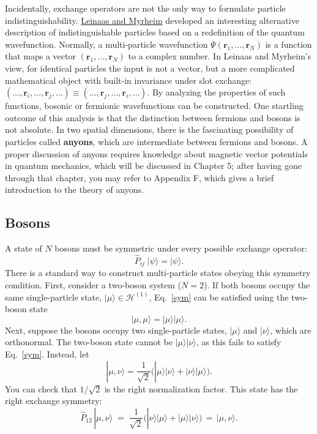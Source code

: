 \documentclass[prx,12pt]{revtex4-2}
\begin{document}
Incidentally, exchange operators are not the only way to formulate
particle indistinguishability.  \hyperref[cite:leinaas]{Leinaas and
  Myrheim} developed an interesting alternative description of
indistinguishable particles based on a redefinition of the quantum
wavefunction.  Normally, a multi-particle wavefunction
$\Psi(\mathbf{r}_1, \dots, \mathbf{r}_N)$ is a function that maps a
vector $(\mathbf{r}_1, \dots, \mathbf{r}_N)$ to a complex number.  In
Leinaas and Myrheim's view, for identical particles the input is not a
vector, but a more complicated mathematical object with built-in
invariance under slot exchange: $(\dots, \mathbf{r}_i, \dots,
\mathbf{r}_j,\dots ) \equiv (\dots, \mathbf{r}_j, \dots,
\mathbf{r}_i,\dots )$.  By analyzing the properties of such functions,
bosonic or fermionic wavefunctions can be constructed.  One startling
outcome of this analysis is that the distinction between fermions and
bosons is not absolute.  In two spatial dimensions, there is the
fascinating possibility of particles called \textbf{anyons}, which are
intermediate between fermions and bosons.  A proper discussion of
anyons requires knowledge about magnetic vector potentials in quantum
mechanics, which will be discussed in Chapter 5; after having gone
through that chapter, you may refer to Appendix F, which gives a brief
introduction to the theory of anyons.

\subsection{Bosons}
\label{sec:bosons}

A state of $N$ bosons must be symmetric under every possible exchange
operator:
\begin{equation}
  \hat{P}_{ij}\; |\psi\rangle = |\psi\rangle.
  \label{sym}
\end{equation}
There is a standard way to construct multi-particle states obeying
this symmetry condition.  First, consider a two-boson system ($N =
2$).  If both bosons occupy the same single-particle state,
$|\mu\rangle \in \mathscr{H}^{(1)}$, Eq.~\eqref{sym} can be satisfied
using the two-boson state
\begin{equation}
  |\mu,\mu\rangle = |\mu\rangle  |\mu\rangle.
  \label{mumu}
\end{equation}
Next, suppose the bosons occupy two single-particle states,
$|\mu\rangle$ and $|\nu\rangle$, which are orthonormal.  The two-boson
state cannot be $|\mu\rangle |\nu\rangle$, as this fails to satisfy
Eq.~\eqref{sym}.  Instead, let
\begin{equation}
  |\mu,\nu\rangle = \frac{1}{\sqrt{2}} \Big( |\mu\rangle |\nu\rangle +
  |\nu\rangle |\mu\rangle\Big).
  \label{bosonmunu}
\end{equation}
You can check that $1/\sqrt{2}$ is the right normalization factor.
This state has the right exchange symmetry:
\begin{equation}
  \hat{P}_{12}\,|\mu,\nu\rangle \;=\; \frac{1}{\sqrt{2}}
  \Big( |\nu\rangle  |\mu\rangle + |\mu\rangle  |\nu\rangle\Big)
  \,=\, |\mu, \nu\rangle.
\end{equation}
\end{document}
